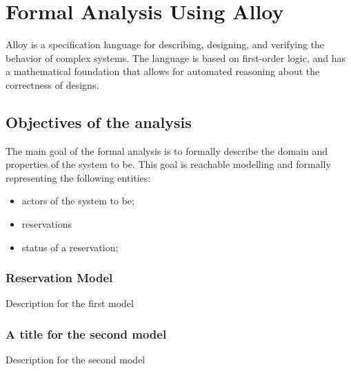 \section{Formal Analysis Using Alloy}
Alloy is a specification language for describing, designing, and verifying the behavior of complex systems.
The language is based on first-order logic, and has a mathematical foundation that allows for automated reasoning
about the correctness of designs.
\subsection{Objectives of the analysis}
The main goal of the formal analysis is to formally describe the domain and properties of the system to be.
This goal is reachable modelling and formally representing the following entities:
\begin{itemize}
    \item actors of the system to be;
    \item reservations
    \item status of a reservation;
\end{itemize}

\subsubsection{Reservation Model}
Description for the first model

\begin{figure}[H]
    \centering
\end{figure}

\subsubsection{A title for the second model}
Description for the second model

\begin{figure}[H]
    \centering
\end{figure}
